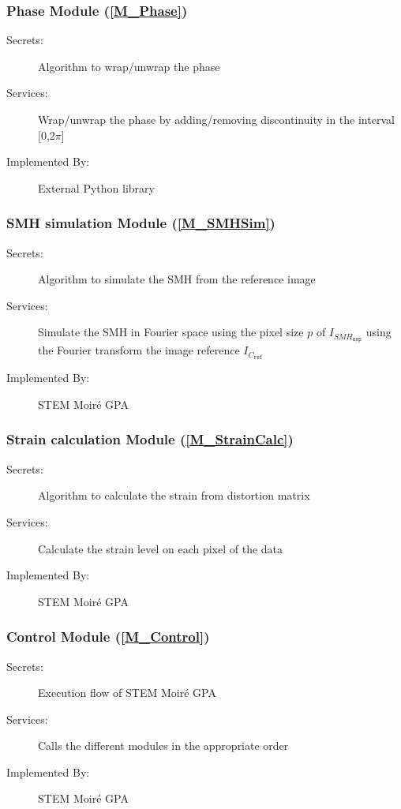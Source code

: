 \documentclass[12pt, titlepage]{article}
\newcommand{\progname}{STEM Moir{\'e} GPA}
\begin{document}
\subsubsection{Phase Module (\cref{M_Phase})}

\begin{description}
\item[Secrets:] Algorithm to wrap/unwrap the phase
\item[Services:] Wrap/unwrap the phase by adding/removing discontinuity in the interval [0,2$\pi$]
\item[Implemented By:] External Python library
\end{description}

\subsubsection{SMH simulation Module (\cref{M_SMHSim})}

\begin{description}
\item[Secrets:] Algorithm to simulate the SMH from the reference image
\item[Services:] Simulate the SMH in Fourier space using the pixel size $p$ of $I_{\mathit{SMH}_{\texttt{exp}}}$ using the Fourier transform the image reference $I_{C_{\texttt{ref}}}$
\item[Implemented By:] \progname{}
\end{description}

\subsubsection{Strain calculation Module (\cref{M_StrainCalc})}

\begin{description}
\item[Secrets:] Algorithm to calculate the strain from distortion matrix
\item[Services:] Calculate the strain level on each pixel of the data
\item[Implemented By:] \progname{}
\end{description}

\subsubsection{Control Module (\cref{M_Control})}

\begin{description}
\item[Secrets:] Execution flow of \progname{}
\item[Services:] Calls the different modules in the appropriate order
\item[Implemented By:] \progname{}
\end{description}
\end{document}
